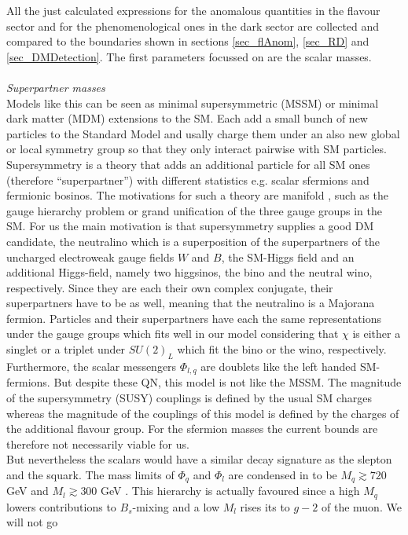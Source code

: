 All the just calculated expressions for the anomalous quantities in the flavour sector and for the phenomenological ones 
in the dark sector are collected and compared to the boundaries shown in sections \ref{sec_flAnom}, \ref{sec_RD} and \ref{sec_DMDetection}. The first
parameters focussed on are the scalar masses.
\\ \\ \textit{Superpartner masses}\\
Models like this can be seen as minimal supersymmetric (MSSM) or minimal dark matter (MDM) extensions to the SM. Each add a small bunch of new particles to 
the Standard Model and usally charge them under an also new global or local symmetry group so that they only interact pairwise with SM particles. 
Supersymmetry is a theory that adds an additional particle for all SM ones (therefore ``superpartner'') with different statistics 
\cite{9709356} e.g. scalar sfermions and fermionic bosinos. The motivations for such a theory are manifold 
\cite{1302.6587}, such as the gauge hierarchy problem or grand unification of the three gauge groups in the SM. 
For us the main motivation is that supersymmetry supplies a good DM
candidate, the neutralino which is a superposition of the superpartners of the uncharged electroweak gauge fields $W$ and $B$, the SM-Higgs field and 
an additional Higgs-field, namely two higgsinos, the bino and the neutral wino, respectively. Since they are each their own complex conjugate,
their superpartners have to be as well, meaning that the neutralino is a Majorana fermion. Particles and their superpartners have each the same 
representations under the gauge groups which fits well in our model considering that $\chi$ is either a singlet or a triplet under $SU(2)_L$ 
which fit the bino or the wino, respectively. Furthermore, the scalar messengers $\Phi_{l,q}$ are doublets like the left handed SM-fermions. 
But despite these
QN, this model is not like the MSSM. The magnitude of the supersymmetry (SUSY) couplings is defined by the usual SM charges whereas the magnitude of 
the couplings of this model is 
defined by the charges of the additional flavour group. For the sfermion masses the current bounds are therefore not necessarily viable for us.\\
\noindent But nevertheless the scalars would have a similar decay signature as the slepton and the squark. The mass limits of $\Phi_q$
and $\Phi_l$ are condensed in \cite{Grip} to be $M_q \gtrsim 720$ GeV \cite{1506.08616} and $M_l \gtrsim 300$ GeV \cite{1403.5294}. This hierarchy is
actually favoured since a high $M_q$ lowers contributions to $B_s$-mixing and a low $M_l$ rises its to $g-2$ of the muon. We will not go 
